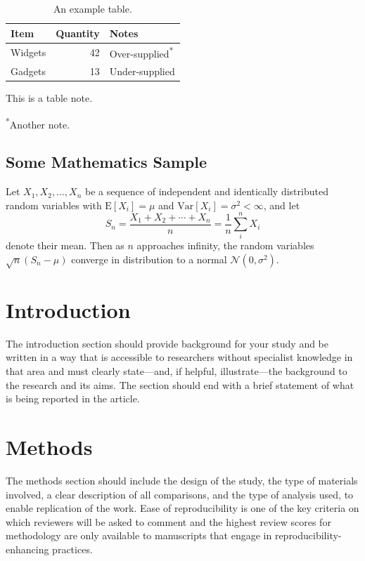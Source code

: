 \documentclass[a4paper,num-refs]{ehi-journals}
\begin{document}
\begin{table}[bt!]
\caption{An example table.}\label{tab:example}
\begin{tabular}{l r l}
\toprule
Item & Quantity & Notes\\
\midrule
Widgets & 42 & Over-supplied\textsuperscript{*} \\
Gadgets & 13 & Under-supplied \\
\bottomrule
\end{tabular}
\begin{tablenotes}
\item This is a table note.
\item \textsuperscript{*}Another note.
\end{tablenotes}
\end{table}


\subsection{Some Mathematics Sample}

Let $X_1, X_2, \ldots, X_n$ be a sequence of independent and identically distributed random variables with $\text{E}[X_i] = \mu$ and $\text{Var}[X_i] = \sigma^2 < \infty$, and let
%
\begin{equation}
S_n = \frac{X_1 + X_2 + \cdots + X_n}{n}
      = \frac{1}{n}\sum_{i}^{n} X_i
\end{equation}
%
denote their mean. Then as $n$ approaches infinity, the random variables $\sqrt{n}(S_n - \mu)$ converge in distribution to a normal $\mathcal{N}(0, \sigma^2)$.


\section{Introduction}
\label{sec:introduction}

The introduction section should provide background for your study and be written in a way that is accessible to researchers without specialist knowledge in that area and must clearly state---and, if helpful, illustrate---the background to the research and its aims. The section should end with a brief statement of what is being reported in the article.

\section{Methods}

The methods section should include the design of the study, the type of materials involved, a clear description of all comparisons, and the type of analysis used, to enable replication of the work. Ease of reproducibility is one of the key criteria on which reviewers will be asked to comment and the highest review scores for methodology are only available to manuscripts that engage in reproducibility-enhancing practices.
\end{document}
